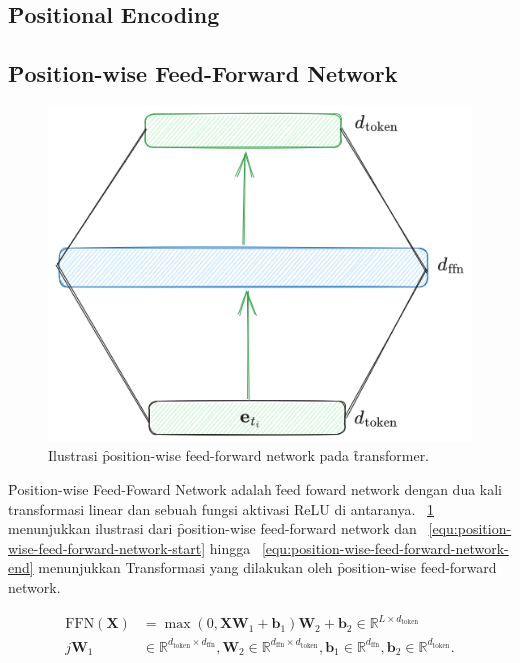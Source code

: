 	\subsection{\f{Positional Encoding}}

	\subsection{\f{Position-wise Feed-Forward Network}}

	\begin{figure}
		\centering
		\includegraphics[width=1\textwidth]{assets/pics/ffn_transformer.png}
		\caption{Ilustrasi \f{position-wise feed-forward network} pada \f{transformer}.}
		\label{fig:position-wise-feed-forward-network}
	\end{figure}

	\f{Position-wise Feed-Foward Network} adalah \f{feed foward network} dengan dua kali transformasi linear dan sebuah fungsi aktivasi ReLU di antaranya. \pic~\ref{fig:position-wise-feed-forward-network} menunjukkan ilustrasi dari \f{position-wise feed-forward network} dan \equ~\ref{equ:position-wise-feed-forward-network-start} hingga \equ~\ref{equ:position-wise-feed-forward-network-end} menunjukkan Transformasi yang dilakukan oleh \f{position-wise feed-forward network}.

	\begin{align}
		\label{equ:position-wise-feed-forward-network-start}
		\text{FFN}(\mathbf{X}) &= \max(0, \mathbf{X}\mathbf{W}_1 + \mathbf{b}_1)\mathbf{W}_2 + \mathbf{b}_2 \in \mathbb{R}^{L \times d_{\text{token}}} \\
		\label{equ:position-wise-feed-forward-network-end}j
		\mathbf{W}_1 &\in \mathbb{R}^{d_{\text{token}} \times d_{\text{ffn}}}, \mathbf{W}_2 \in \mathbb{R}^{d_{\text{ffn}} \times d_{\text{token}}}, \mathbf{b}_1 \in \mathbb{R}^{d_{\text{ffn}}}, \mathbf{b}_2 \in \mathbb{R}^{d_{\text{token}}}.
	\end{align}

